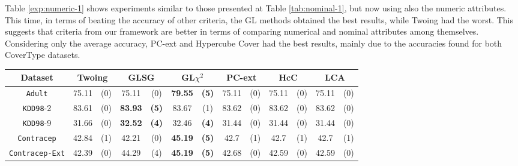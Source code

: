 Table \ref{exp:numeric-1} shows experiments  similar to those presented at Table \ref{tab:nominal-1}, but now
using also the numeric attributes. This time, in terms of beating the accuracy of other criteria, the GL methods obtained the best results, while Twoing had the worst. This suggests that criteria from our framework are better in terms of comparing numerical and nominal attributes among themselves. Considering only the average accuracy, PC-ext and Hypercube Cover had the best results, mainly due to the accuracies found for both CoverType datasets.

\begin{table}
\small
\centering
\begin{tabular}{c|cc|cc|cc|cc|cc|cc} 
Dataset            &\multicolumn{2}{c|}{Twoing} & \multicolumn{2}{c|}{GLSG} & \multicolumn{2}{c|}{GL$\chi^2$} & \multicolumn{2}{c|}{PC-ext}& \multicolumn{2}{c|}{HcC}& \multicolumn{2}{c}{LCA}\\
\hline   
{\tt Adult}        & 75.11          &  (0)      & 75.11      & (0)          & {\bf 79.55} &  {\bf (5)}        & 75.11       &  (0)         & 75.11       &  (0)     & 75.11       & (0)       \\
{\tt KDD98}-2      & 83.61          &  (0)      & {\bf 83.93}& {\bf (5)}    & 83.67       &  (1)              & 83.62       &  (0)         & 83.62       &  (0)     & 83.62       & (0)       \\ 
{\tt KDD98}-9      & 31.66          &  (0)      &{\bf 32.52} & {\bf (4)}    & 32.46       &  {\bf (4)}        & 31.44       &  (0)         & 31.44       &  (0)     & 31.44       & (0)       \\ 
{\tt Contracep}    & 42.84          &  (1)      & 42.21      & (0)          & {\bf 45.19} &  {\bf (5)}        & 42.7        &  (1)         & 42.7        &  (1)     & 42.7        & (1)       \\  
{\tt Contracep-Ext}& 42.39          &  (0)      & 44.29      & (4)          & {\bf 45.19} &  {\bf (5)}        & 42.68       &  (0)         & 42.59       &  (0)     & 42.59       & (0)       \\ 

\end{tabular}
\end{table}
